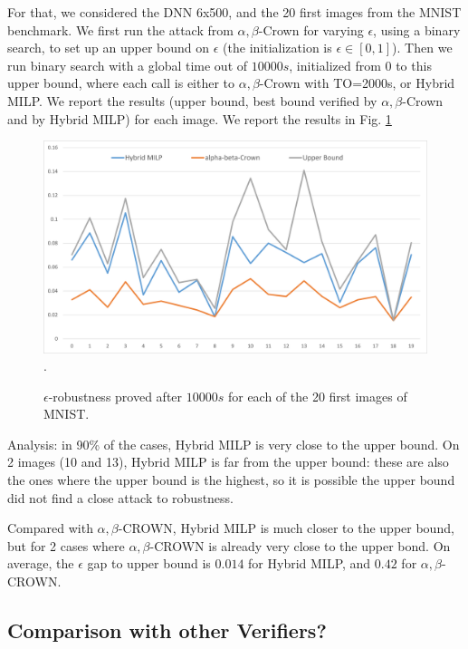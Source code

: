 For that, we considered the DNN 6x500, and the 20 first images from the MNIST benchmark.
We first run the attack from $\alpha,\beta$-Crown for varying $\epsilon$, using a binary search, to set up an upper bound on $\epsilon$ (the initialization is $\epsilon \in [0,1]$).
Then we run binary search with a global time out of $10 000s$, initialized from $0$ to this upper bound, where each call is either to $\alpha,\beta$-Crown with TO=2000s, or Hybrid MILP.
We report the results (upper bound, best bound verified by $\alpha,\beta$-Crown and by Hybrid MILP) for each image. We report the results in Fig. \ref{fig2}

\begin{figure}[t!]
	\begin{centering}
\includegraphics[scale=0.5]{epsilon.png}.
\caption{$\epsilon$-robustness proved after $10 000s$ for each of the 20 first images of MNIST.}
\label{fig2}
	\end{centering}
\end{figure}

Analysis: in 90\% of the cases, Hybrid MILP is very close to the upper bound. On 2 images (10 and 13), Hybrid MILP is far from the upper bound: these are also the ones where the upper bound is the highest, so it is possible the upper bound did not find a close attack to robustness.

Compared with $\alpha,\beta$-CROWN, Hybrid MILP is much closer to the upper bound, but for 2 cases where $\alpha,\beta$-CROWN is already very close to the upper bond. On average, the $\epsilon$ gap to upper bound is $0.014$ for Hybrid MILP, and $0.42$ for 
$\alpha,\beta$-CROWN.



\subsection{Comparison with other Verifiers?}


